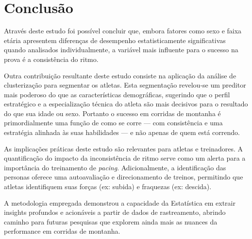 \chapter{Conclusão}
\label{chap:conclusao}

Através deste estudo foi possível concluir que, embora fatores como sexo e faixa etária apresentem diferenças de desempenho estatisticamente significativas quando analisados individualmente, a variável mais influente para o sucesso na prova é a consistência do ritmo. 

Outra contribuição resultante deste estudo consiste na aplicação da análise de clusterização para segmentar os atletas. Esta segmentação revelou-se um preditor mais poderoso do que as características demográficas, sugerindo que o perfil estratégico e a especialização técnica do atleta são mais decisivos para o resultado do que sua idade ou sexo. Portanto o sucesso em corridas de montanha é primordialmente uma função de como se corre — com consistência e uma estratégia alinhada às suas habilidades — e não apenas de quem está correndo.

As implicações práticas deste estudo são relevantes para atletas e treinadores. A quantificação do impacto da inconsistência de ritmo serve como um alerta para a importância do treinamento de \textit{pacing}. Adicionalmente, a identificação das personas oferece uma autoavaliação e direcionamento de treinos, permitindo que atletas identifiquem suas forças (ex: subida) e fraquezas (ex: descida).

A metodologia empregada demonstrou a capacidade da Estatística em extrair insights profundos e acionáveis a partir de dados de rastreamento, abrindo caminho para futuras pesquisas que explorem ainda mais as nuances da performance em corridas de montanha.

